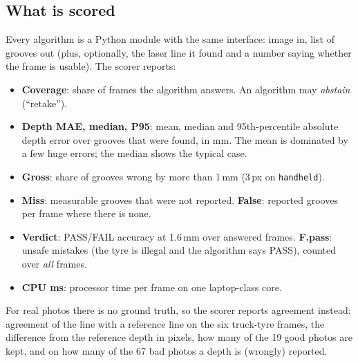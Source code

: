 \subsection{What is scored}

Every algorithm is a Python module with the same interface: image in, list of grooves out (plus, optionally, the
laser line it found and a number saying whether the frame is usable). The scorer reports:

\begin{itemize}
\item \textbf{Coverage}: share of frames the algorithm answers. An algorithm may \emph{abstain} (``retake'').
\item \textbf{Depth MAE, median, P95}: mean, median and 95th-percentile absolute depth error over grooves that were
      found, in mm. The mean is dominated by a few huge errors; the median shows the typical case.
\item \textbf{Gross}: share of grooves wrong by more than 1\,mm (3\,px on \texttt{handheld}).
\item \textbf{Miss}: measurable grooves that were not reported. \textbf{False}: reported grooves per frame where
      there is none.
\item \textbf{Verdict}: PASS/FAIL accuracy at 1.6\,mm over answered frames. \textbf{F.pass}: unsafe mistakes (the
      tyre is illegal and the algorithm says PASS), counted over \emph{all} frames.
\item \textbf{CPU ms}: processor time per frame on one laptop-class core.
\end{itemize}

For real photos there is no ground truth, so the scorer reports agreement instead: agreement of the line with a
reference line on the six truck-tyre frames, the difference from the reference depth in pixels, how many of the
19 good photos are kept, and on how many of the 67 bad photos a depth is (wrongly) reported.

